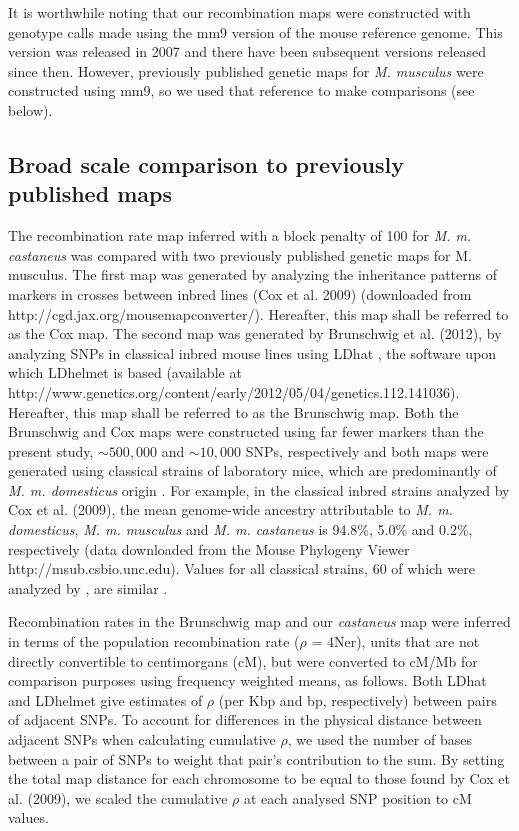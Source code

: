 It is worthwhile noting that our recombination maps were constructed with genotype calls made using the mm9 version of the mouse reference genome. This version was released in 2007 and there have been subsequent versions released since then. However, previously published genetic maps for \textit{M. musculus} were constructed using mm9, so we used that reference to make comparisons (see below).
 
\subsection{Broad scale comparison to previously published maps}
 
The recombination rate map inferred with a block penalty of 100 for \emph{M. m. castaneus} was compared with two previously published genetic maps for M. musculus. The first map was generated by analyzing the inheritance patterns of markers in crosses between inbred lines (Cox et al. 2009) (downloaded from http://cgd.jax.org/mousemapconverter/). Hereafter, this map shall be referred to as the Cox map. The second map was generated by Brunschwig et al. (2012), by analyzing SNPs in classical inbred mouse lines using LDhat \citep{RN260}, the software upon which LDhelmet is based (available at http://www.genetics.org/content/early/2012/05/04/genetics.112.141036). Hereafter, this map shall be referred to as the Brunschwig map. Both the Brunschwig and Cox maps were constructed using far fewer markers than the present study, $\sim500,000$ and $\sim10,000$ SNPs, respectively and both maps were generated using classical strains of laboratory mice, which are predominantly of \emph{M. m. domesticus} origin \citep{RN243}. For example, in the classical inbred strains analyzed by Cox et al. (2009), the mean genome-wide ancestry attributable to \emph{M. m. domesticus}, \emph{M. m. musculus} and \emph{M. m. castaneus} is 94.8\%, 5.0\% and 0.2\%, respectively (data downloaded from the Mouse Phylogeny Viewer \citep{RN280} http://msub.csbio.unc.edu). Values for all classical strains, 60 of which were analyzed by \cite{RN156}, are similar \citep{RN243}.

Recombination rates in the Brunschwig map and our \textit{castaneus} map were inferred in terms of the population recombination rate ($\rho$ = 4Ner), units that are not directly convertible to centimorgans (cM), but were converted to cM/Mb for comparison purposes using frequency weighted means, as follows. Both LDhat and LDhelmet give estimates of $\rho$ (per Kbp and bp, respectively) between pairs of adjacent SNPs. To account for differences in the physical distance between adjacent SNPs when calculating cumulative $\rho$, we used the number of bases between a pair of SNPs to weight that pair’s contribution to the sum. By setting the total map distance for each chromosome to be equal to those found by Cox et al. (2009), we scaled the cumulative $\rho$ at each analysed SNP position to cM values.
 
